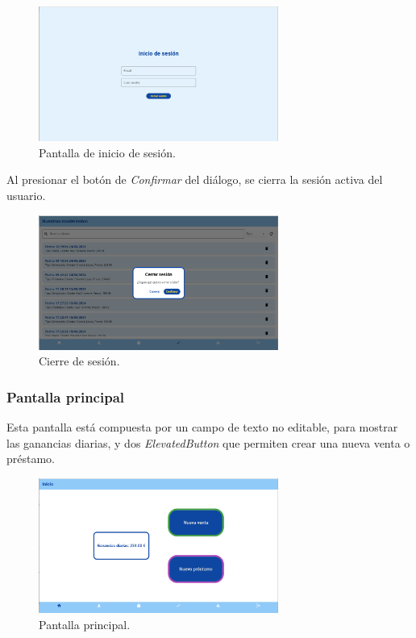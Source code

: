 \begin{figure}[H]
	\centering
	\includegraphics[width=0.7\textwidth]{imagenes/TerceraIteracion/login.png}
	\caption{Pantalla de inicio de sesión.}
\end{figure}

Al presionar el botón de \textit{Confirmar} del diálogo, se cierra la sesión activa del usuario. 

\begin{figure}[H]
	\centering
	\includegraphics[width=0.7\textwidth]{imagenes/TerceraIteracion/logout.png}
	\caption{Cierre de sesión.}
\end{figure}

\newpage

\subsubsection{Pantalla principal}

Esta pantalla está compuesta por un campo de texto no editable, para mostrar las ganancias diarias, y dos \textit{ElevatedButton} que permiten crear una nueva venta o préstamo. 

\begin{figure}[H]
	\centering
	\includegraphics[width=0.7\textwidth]{imagenes/TerceraIteracion/mainPage.png}
	\caption{Pantalla principal.}
\end{figure}

